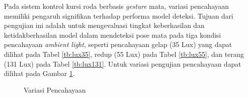 Pada sistem kontrol kursi roda berbasis \emph{gesture} mata, variasi pencahayaan memiliki pengaruh signifikan terhadap performa model deteksi. Tujuan dari pengujian ini adalah untuk mengevaluasi tingkat keberhasilan dan ketidakberhasilan model dalam mendeteksi pose mata pada tiga kondisi pencahayaan \emph{ambient light}, seperti pencahayaan gelap (35 Lux) yang dapat dilihat pada Tabel \ref{tb:lux35}, redup (55 Lux) pada Tabel \ref{tb:lux55}, dan terang (131 Lux) pada Tabel \ref{tb:lux131}. Untuk variasi pengujian pencahayaan dapat dilihat pada Gambar \ref{fig:Variasi Pencahayaan}.

\begin{figure}[H]
  \centering
  \hfil


  \caption{Variasi Pencahayaan}
  \label{fig:Variasi Pencahayaan}
\end{figure}

